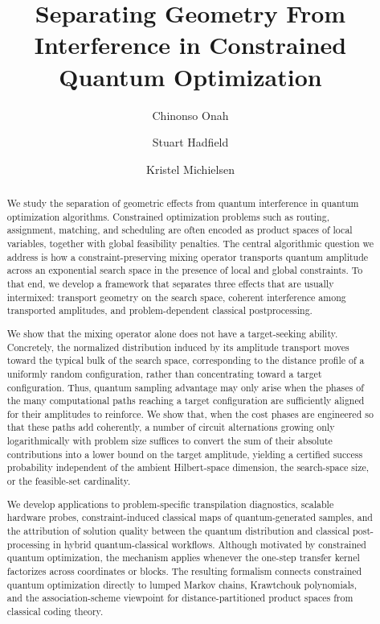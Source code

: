 \documentclass[a4paper,onecolumn,11pt,unpublished]{quantumarticle}
\author{Chinonso Onah}
\affiliation{Volkswagen AG, Berliner Ring 2, 38440 Wolfsburg, Germany}
\affiliation{Department of Physics, RWTH Aachen University, 52056 Aachen, Germany}
\author{Stuart Hadfield}
\affiliation{USRA Research Institute for Advanced Computer Science (RIACS), CA, USA}
\author{Kristel Michielsen}
\affiliation{Forschungszentrum Jülich, Germany}
\affiliation{Universit\"at zu K\"oln, 50923 K\"oln, Germany}
\title{Separating Geometry From Interference in Constrained Quantum Optimization}
\theoremstyle{remark}
\begin{document}

\maketitle
\begin{abstract}

We study the separation of geometric effects from quantum interference in quantum optimization algorithms. Constrained optimization problems such as routing, assignment, matching, and scheduling are often encoded as product spaces of local variables, together with global feasibility penalties. The central algorithmic question we address is how a constraint-preserving mixing operator transports quantum amplitude across an exponential search space in the presence of local and global constraints. To that end, we develop a framework that separates three effects that are usually intermixed: transport geometry on the search space, coherent interference among transported amplitudes, and problem-dependent classical postprocessing. 


We show that the mixing operator alone does not have a target-seeking ability. Concretely, the normalized distribution induced by its amplitude transport moves toward the typical bulk of the search space, corresponding to the distance profile of a uniformly random configuration, rather than concentrating toward a target configuration. Thus, quantum sampling advantage may only arise when the phases of the many computational paths reaching a target configuration are sufficiently aligned for their amplitudes to reinforce. We show that, when the cost phases are engineered so that these paths add coherently, a number of circuit alternations growing only logarithmically with problem size suffices to convert the sum of their absolute contributions into a lower bound on the target amplitude, yielding a certified success probability independent of the ambient Hilbert-space dimension, the search-space size, or the feasible-set cardinality.

We develop applications to problem-specific transpilation diagnostics, scalable hardware probes, constraint-induced classical maps of quantum-generated samples, and the attribution of solution quality between the quantum distribution and classical post-processing in hybrid quantum-classical workflows. Although motivated by constrained quantum optimization, the mechanism applies whenever the one-step transfer kernel factorizes across coordinates or blocks. The resulting formalism connects constrained quantum optimization directly to lumped Markov chains, Krawtchouk polynomials, and the association-scheme viewpoint for distance-partitioned product spaces from classical coding theory.
\end{abstract}
\end{document}
